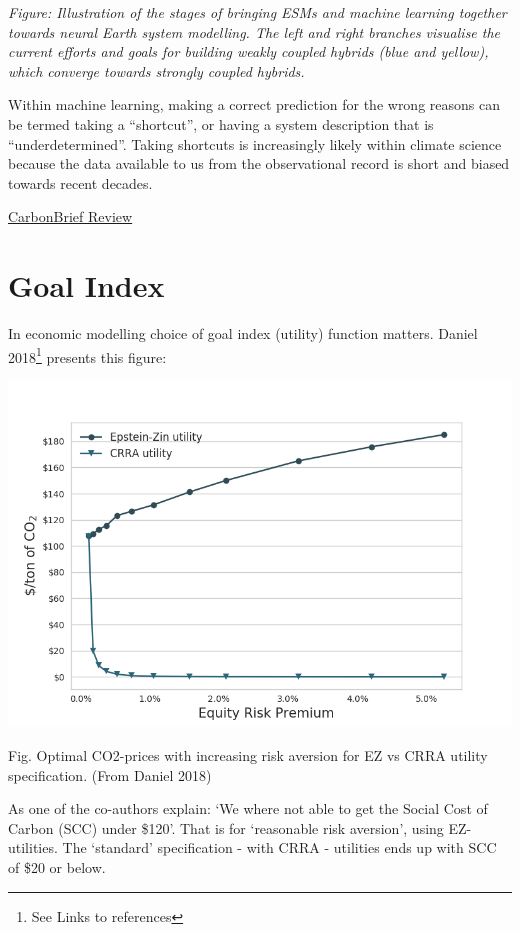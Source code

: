 \documentclass[
]{book}
\begin{document}
\emph{Figure: Illustration of the stages of bringing ESMs and machine learning together towards neural Earth system modelling. The left and right branches visualise the current efforts and goals for building weakly coupled hybrids (blue and yellow), which converge towards strongly coupled hybrids. }

Within machine learning, making a correct prediction for the wrong reasons can be termed taking a ``shortcut'', or having a system description that is ``underdetermined''. Taking shortcuts is increasingly likely within climate science because the data available to us from the observational record is short and biased towards recent decades.

\href{https://www.carbonbrief.org/guest-post-how-artificial-intelligence-is-fast-becoming-a-key-tool-for-climate-science}{CarbonBrief Review}

\hypertarget{goal-index}{%
\section{Goal Index}\label{goal-index}}

In economic modelling choice of goal index (utility) function matters.
Daniel 2018\footnote{See Links to references} presents this figure:

\includegraphics{fig/fig_EZvsCRRA_daniel2018fig1.png}

Fig. Optimal CO2-prices with increasing risk aversion for EZ vs CRRA utility specification. (From Daniel 2018)

As one of the co-authors explain: `We where not able to get the Social
Cost of Carbon (SCC) under \$120'.
That is for `reasonable risk aversion', using EZ-utilities.
The `standard' specification - with CRRA - utilities ends up with SCC
of \$20 or below.
\end{document}
